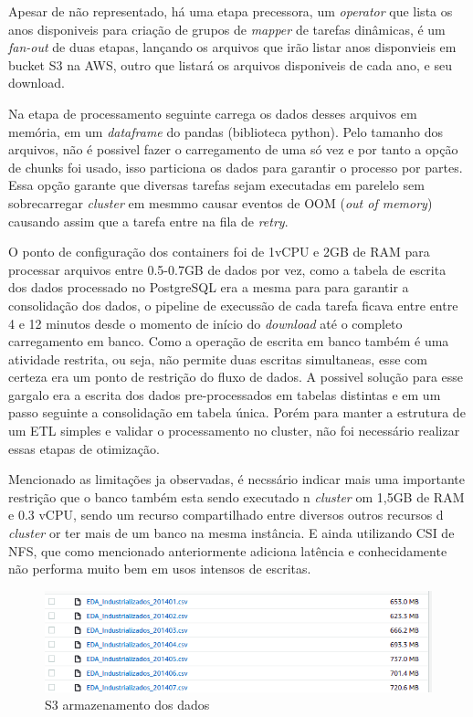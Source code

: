 Apesar de não representado, há uma etapa precessora, um \emph{operator} que lista os anos disponiveis para criação de grupos de \emph{mapper} de tarefas dinâmicas, é um \emph{fan-out} de duas etapas, lançando os arquivos que irão listar anos disponvieis em bucket S3 na AWS, outro que listará os arquivos disponiveis de cada ano, e seu download.

Na etapa de processamento seguinte carrega os dados desses arquivos em memória, em um \emph{dataframe} do {pandas} (biblioteca python). Pelo tamanho dos arquivos, não é possivel fazer o carregamento de uma só vez e por tanto a opção de chunks foi usado, isso particiona os dados para garantir o processo por partes. Essa opção garante que diversas tarefas sejam executadas em parelelo sem sobrecarregar  \emph{cluster} em mesmmo causar eventos de OOM (\emph{out of memory}) causando assim que a tarefa entre na fila de \emph{retry}.

O ponto de configuração dos containers foi de 1vCPU e 2GB de RAM para processar arquivos entre 0.5-0.7GB de dados por vez, como a tabela de escrita dos dados processado no PostgreSQL era a mesma para para garantir a consolidação dos dados, o pipeline de execussão de cada tarefa ficava entre entre 4 e 12 minutos desde o momento de início do \emph{download} até o completo carregamento em banco. Como a operação de escrita em banco também é uma atividade restrita, ou seja, não permite duas escritas simultaneas, esse com certeza era um ponto de restrição do fluxo de dados. A possivel solução para esse gargalo era a escrita dos dados pre-processados em tabelas distintas e em um passo seguinte a consolidação em tabela única. Porém para manter a estrutura de um ETL simples e validar o processamento no cluster, não foi necessário realizar essas etapas de otimização. 

Mencionado as limitações ja observadas, é necssário indicar mais uma importante restrição que o banco também esta sendo executado n \emph{cluster} om 1,5GB de RAM e 0.3 vCPU, sendo um recurso compartilhado entre diversos outros recursos d \emph{cluster} or ter mais de um banco na mesma instância. E ainda utilizando CSI de NFS, que como mencionado anteriormente adiciona latência e conhecidamente não performa muito bem em usos intensos de escritas.

\begin{figure}[!ht]
    \centering
    \includegraphics[width=0.8\linewidth]{04-figuras/s3_size.png}
    \caption{S3 armazenamento dos dados}
    \label{fig:s3_storage}
\end{figure}



